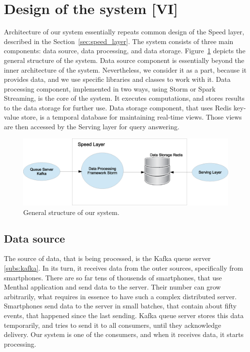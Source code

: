 \section{Design of the system [VI]}

Architecture of our system essentially repeats common design of the Speed layer, described in the Section~\ref{sec:speed_layer}.
The system consists of three main components: data source, data processing, and data storage.
Figure~\ref{fig:SpeedLayerArchitecture} depicts the general structure of the system.
Data source component is essentially beyond the inner architecture of the system.
Nevertheless, we consider it as a part, because it provides data, and we use specific libraries and classes to work with it.
Data processing component, implemented in two ways, using Storm or Spark Streaming, is the core of the system.
It executes computations, and stores results to the data storage for further use.
Data storage component, that uses Redis key-value store, is a temporal database for maintaining real-time views.
Those views are then accessed by the Serving layer for query answering.

\begin{figure}[h]
  \centering
  \includegraphics [width=1.0\textwidth]{images/SpeedLayerArchitecture}
  \caption{General structure of our system.}
  \label{fig:SpeedLayerArchitecture}
\end{figure}

\subsection{Data source}

The source of data, that is being processed, is the Kafka queue server \ref{subs:kafka}.
In its turn, it receives data from the outer sources, specifically from smartphones.
There are so far tens of thousends of smartphones, that use Menthal application and send data to the server.
Their number can grow arbitrarily, what requires in essence to have such a complex distributed server.
Smartphones send data to the server in small batches, that contain about fifty events, that happened since the last sending.
Kafka queue server stores this data temporarily, and tries to send it to all consumers, until they acknowledge delivery.
Our system is one of the consumers, and when it receives data, it starts processing. 

